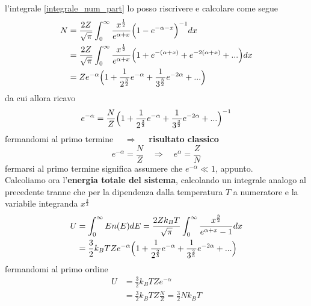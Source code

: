 l'integrale \ref{integrale_num_part} lo posso riscrivere e calcolare come segue 
\begin{equation}
\begin{split}
N & = \frac{2Z}{\sqrt{\pi}} \int_0^{\infty} \frac{x^{ \frac{1}{2} }}{e^{ \alpha + x }} \Bigl(  1 - e^{ - \alpha - x }  \Bigr)^{ -1 } dx \\ 
& = \frac{2Z}{\sqrt{\pi}} \int_0^{\infty} \frac{x^{ \frac{1}{2} }}{e^{ \alpha + x }} \Bigl(  1 + e^{ - (\alpha + x) } + e^{ - 2 (\alpha + x) } + ...   \Bigr)
dx \\ &= Z e^{ -\alpha } \Bigl(  1 + \frac{1}{2^{\frac{3}{2}}}e^{ -\alpha } + \frac{1}{3^{\frac{3}{2}}} e^{ -2\alpha } + ...  \Bigr)
\end{split}
\end{equation}
da cui allora ricavo
\begin{equation}
e^{ -\alpha } = \frac{N}{Z} \Bigl(  1 + \frac{1}{2^{\frac{3}{2}}}e^{ -\alpha } + \frac{1}{3^{\frac{3}{2}}} e^{ -2\alpha } + ...  \Bigr)^{ -1 }
\end{equation}
fermandomi al primo termine $\quad\Rightarrow\quad $ \textbf{risultato classico}
\begin{equation}
e^{ -\alpha } = \frac{N}{Z} \quad\Rightarrow\quad e^{ \alpha } = \frac{Z}{N}
\end{equation}
fermarsi al primo termine significa assumere che $e^{ -\alpha } \ll 1$, appunto. \\
Calcoliamo ora l'\textbf{energia totale del sistema}, calcolando un integrale analogo al precedente tranne che per la dipendenza dalla temperatura $T$ a numeratore e la variabile integranda $x^{ \frac{3}{2} }$ 
\begin{equation}
\begin{split}
U & = \int_0^{\infty} E n(E)dE = \frac{2Zk_B T}{\sqrt{\pi}} \int_0^{\infty} \frac{x^{ \frac{3}{2} }}{e^{ \alpha + x } - 1 } dx \\
& = \frac{3}{2} k_B T Z e^{ -\alpha } \Bigl(  1 + \frac{1}{2^{ \frac{2}{5} }} e^{ -\alpha } +  \frac{1}{3^{ \frac{2}{5} }} e^{ -2 \alpha } + ... \Bigr)
\end{split}
\end{equation}
fermandomi al primo ordine
\begin{equation}
\begin{split}
U & = \frac{3}{2} k_B T Z e^{ -\alpha } \\
& = \frac{3}{2} k_B T Z \frac{N}{Z} = \frac{3}{2} N k_B T
\end{split}
\end{equation}
